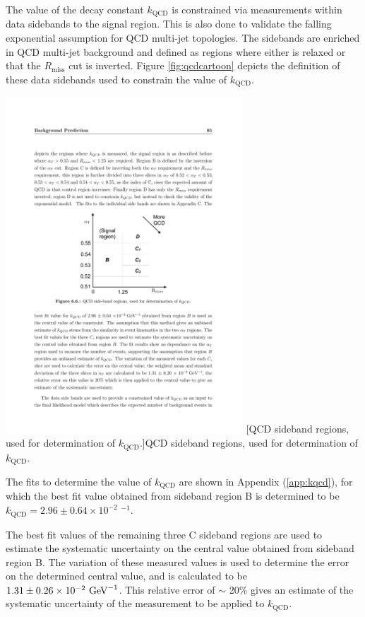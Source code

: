 The value of the decay constant $k_{\text{QCD}}$ is constrained via measurements within data sidebands to the signal region. This is also done to validate the falling exponential assumption for QCD multi-jet topologies. The sidebands are enriched in QCD multi-jet background and defined as regions where either \alphat is relaxed or that the $R_{\text{miss}}$ cut is inverted. Figure \ref{fig:qcdcartoon} depicts the definition of these data sidebands used to constrain the value of $k_{\text{QCD}}$.

\begin{minipage}{\linewidth}
\centering
\includegraphics[width = 3.5in]{plots/qcd_cartoon.pdf}
[QCD sideband regions, used for determination of $k_{\text{QCD}}$.]{QCD sideband regions, used for determination of $k_{\text{QCD}}$.}
\label{fig:qcdcartoon}
\end{minipage}

The fits to determine the value of $k_{\text{QCD}}$ are shown in Appendix (\ref{app:kqcd}), for which the best fit value obtained from sideband region B is determined to be $k_{\text{QCD}} = 2.96 \pm 0.64 \times 10^{-2}$ \GeV$^{-1}$. 

The best fit values of the remaining three C sideband regions are used to estimate the systematic uncertainty on the central value obtained from sideband region B. The variation of these measured values is used to determine the error on the determined central value, and is calculated to be $1.31 \pm 0.26 \times 10^{-2} \text{ GeV}^{-1}$. This relative error of $\sim$ 20\% gives an estimate of the systematic uncertainty of the measurement to be applied to $k_{\text{QCD}}$.

